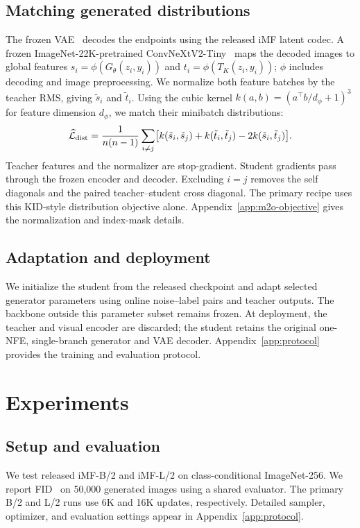 \documentclass{article}
\begin{document}
\subsection{Matching generated distributions}
The frozen VAE~\citep{rombach2022latent} decodes the endpoints using the
released iMF latent codec. A frozen ImageNet-22K-pretrained
ConvNeXtV2-Tiny~\citep{woo2023convnextv2} maps the decoded images to global
features $s_i=\phi(G_\theta(z_i,y_i))$ and $t_i=\phi(T_K(z_i,y_i))$;
$\phi$ includes decoding and image preprocessing. We normalize both feature
batches by the teacher RMS, giving $\tilde s_i$ and $\tilde t_i$.
Using the cubic kernel $k(a,b)=(a^\top b/d_\phi+1)^3$ for feature dimension
$d_\phi$, we match their minibatch distributions:
\begin{equation}
\widehat{\mathcal{L}}_{\rm dist}
=\frac{1}{n(n-1)}\sum_{i\ne j}
\bigl[k(\tilde s_i,\tilde s_j)+k(\tilde t_i,\tilde t_j)-2k(\tilde s_i,\tilde t_j)\bigr].
\label{eq:dist}
\end{equation}
Teacher features and the normalizer are stop-gradient. Student gradients
pass through the frozen encoder and decoder. Excluding $i=j$ removes the
self diagonals and the paired teacher--student cross diagonal.
The primary recipe uses this KID-style distribution objective alone.
Appendix~\ref{app:m2o-objective} gives the normalization and index-mask details.

\subsection{Adaptation and deployment}
We initialize the student from the released checkpoint and adapt selected
generator parameters using online noise--label pairs and teacher outputs.
The backbone outside this parameter subset remains frozen.
At deployment, the teacher and visual encoder are discarded; the student
retains the original one-NFE, single-branch generator and VAE decoder.
Appendix~\ref{app:protocol} provides the training and evaluation protocol.

\section{Experiments}
\label{sec:experiments}
\subsection{Setup and evaluation}
We test released iMF-B/2 and iMF-L/2 on class-conditional ImageNet-256.
We report FID~\citep{heusel2017gans} on 50,000 generated images using a shared
evaluator. The primary B/2 and L/2 runs use 6K and 16K updates, respectively.
Detailed sampler, optimizer, and evaluation settings appear in
Appendix~\ref{app:protocol}.
\end{document}
